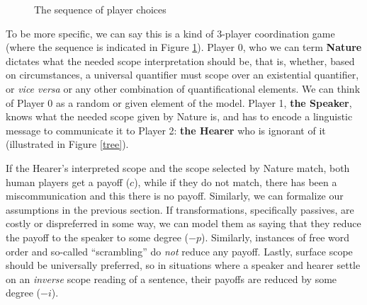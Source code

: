\documentclass{article}
\begin{document}
\begin{figure}
\begin{center}
\end{center}
	\caption{The sequence of player choices\label{seq}}
\end{figure}

To be more specific, we can say this is a kind of 3-player coordination game (where the sequence is indicated in Figure \ref{seq}).
Player 0, who we can term \textbf{Nature} dictates what the needed scope interpretation should be, that is, whether, based on circumstances, a universal quantifier must scope over an existential quantifier, or \emph{vice versa} or any other combination of quantificational elements.
We can think of Player 0 as a random or given element of the model.
Player 1, \textbf{the Speaker}, knows what the needed scope given by Nature is, and has to encode a linguistic message to communicate it to Player 2: \textbf{the Hearer} who is ignorant of it (illustrated in Figure \ref{tree}).

If the Hearer's interpreted scope and the scope selected by Nature match, both human players get a payoff ($c$), while if they do not match, there has been a miscommunication and this there is no payoff.
Similarly, we can formalize our assumptions in the previous section.
If transformations, specifically passives, are costly or dispreferred in some way, we can model them as saying that they reduce the payoff to the speaker to some degree ($-p$).
Similarly, instances of free word order and so-called ``scrambling'' do \emph{not} reduce any payoff.
Lastly, surface scope should be universally preferred, so in situations where a speaker and hearer settle on an \emph{inverse} scope reading of a sentence, their payoffs are reduced by some degree ($-i$).
\end{document}
